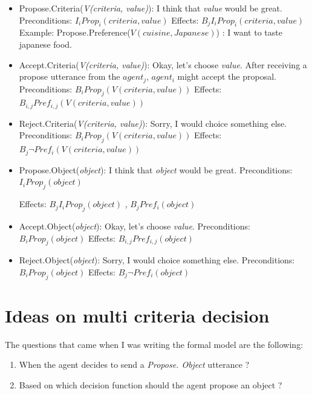 \documentclass{llncs}
\begin{document}
\begin{itemize}
 \item Propose.Criteria(\textit{V(criteria, value)}): I think that \textit{value}  would be great. 
	  \subitem Preconditions:  $ I_{i} Prop_i(criteria, value) $
	  \subitem Effects:  $B_{j} I_{i} Prop_i(criteria, value)$
	  \subitem Example: Propose.Preference(\textit{$V(cuisine,Japanese)$}) : I want to taste japanese food.

 \item Accept.Criteria(\textit{V(criteria, value)}): Okay, let's choose \textit{value}. After receiving a propose utterance from the $agent_{j}$,  $agent_{i}$ might accept the proposal.
   \subitem Preconditions: $ B_i Prop_j (V(criteria, value))$
   \subitem Effects:  $B_{i,j} Pref_{i,j}(V(criteria, value))$
   
 \item Reject.Criteria(\textit{V(criteria, value)}): Sorry, I would choice something else.
    \subitem Preconditions: $ B_i Prop_j (V(criteria, value))$
    \subitem Effects:  $B_{j} \neg  Pref_{i}(V(criteria, value))$
 
  \item Propose.Object(\textit{object}): I think that \textit{object} would be great.
  \subitem Preconditions:  $ I_{i} Prop_{j}(object)$
  
  \subitem Effects:  $B_{j} I_{i} Prop_{j}(object)$ ,  $ B_{j} Pref_{i}(object)$  
  \item Accept.Object(\textit{object}): Okay, let's choose \textit{value}.
     \subitem Preconditions: $ B_i Prop_j (object)$
     \subitem Effects:  $B_{i,j} Pref_{i,j}(object)$ 
  
  \item Reject.Object(\textit{object}): Sorry, I would choice something else.
     \subitem Preconditions: $ B_i Prop_j (object)$
      \subitem Effects:  $B_{j} \neg  Pref_{i}(object)$
 \end{itemize} 


 

\section{Ideas on multi criteria decision}
The questions that came when I was writing the formal model are the following: 
\begin{enumerate}
	\item When the agent decides to send a \emph{Propose. Object} utterance ?
	\item Based on which decision function should the agent propose an object ?
\end{enumerate}
\end{document}
